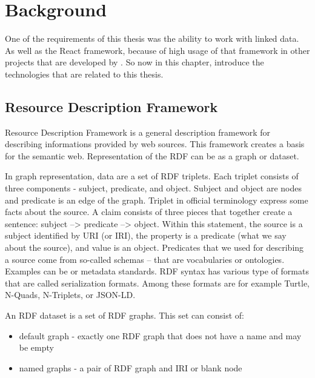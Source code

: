 
\chapter{Background} %

\label{Chapter2} %

One of the requirements of this thesis was the ability to work with linked data. As well as the React framework, because of high usage of that framework in other projects that are developed by \groupname. So now in this chapter, introduce the technologies that are related to this thesis.


\section{Resource Description Framework}

Resource Description Framework \parencite{Guha+Brickey+McBride} is a general description framework for describing informations provided by web sources. This framework creates a basis for the semantic web. Representation of the RDF can be as a graph or dataset. 

In graph representation, data are a set of RDF triplets. Each triplet consists of three components - subject, predicate, and object. Subject and object are nodes and predicate is an edge of the graph. Triplet in official terminology express some facts about the source. A claim consists of three pieces that together create a sentence: subject --> predicate --> object.  Within this statement, the source is a subject identified by URI (or IRI), the property is a predicate (what we say about the source), and value is an object. Predicates that we used for describing a source come from so-called schemas – that are
vocabularies or ontologies. Examples can be \cite{DC} or \cite{foaf} metadata standards. RDF syntax has various type of formats that are called serialization formats. Among these formats are for example Turtle, N-Quads, N-Triplets, or JSON-LD.\parencite{JSON-LD}

An RDF dataset is a set of RDF graphs. This set can consist of:
\begin{itemize}
\item default graph - exactly one RDF graph that does not have a name and may be empty
\item named graphs - a pair of RDF graph and IRI or blank node
\end{itemize}


